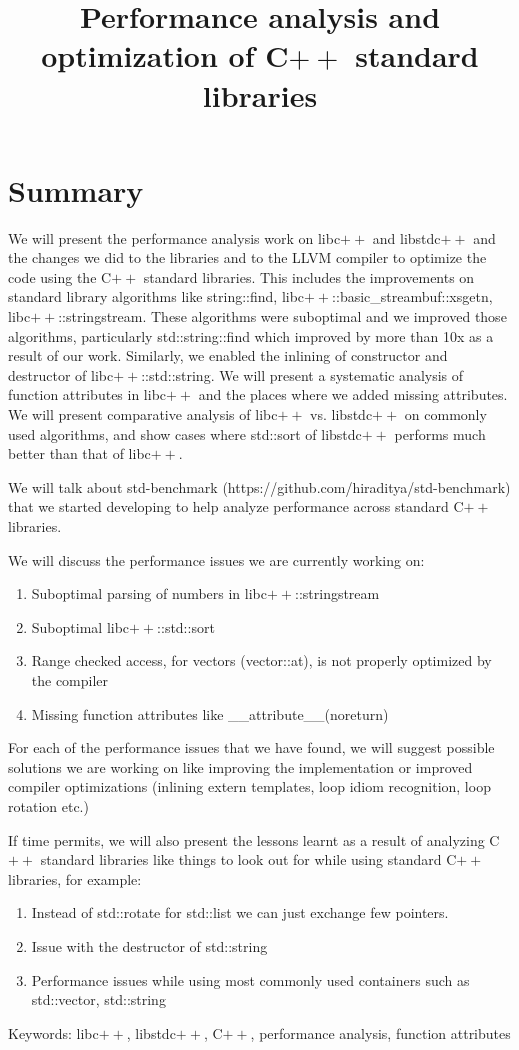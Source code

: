 \documentclass[10pt]{article}
\begin{document}
\title{Performance analysis and optimization of C$++$ standard libraries}
\date{}

\maketitle

\section{Summary}
We will present the performance analysis work on libc$++$ and libstdc$++$ and
the changes we did to the libraries and to the LLVM compiler to optimize the
code using the C$++$ standard libraries. This includes the improvements on
standard library algorithms like string::find,
libc$++$::basic\_streambuf::xsgetn, libc$++$::stringstream. These algorithms
were suboptimal and we improved those algorithms, particularly std::string::find
which improved by more than 10x as a result of our work. Similarly, we enabled
the inlining of constructor and destructor of libc$++$::std::string. We will
present a systematic analysis of function attributes in libc$++$ and the places
where we added missing attributes. We will present comparative analysis of
libc$++$ vs. libstdc$++$ on commonly used algorithms, and show cases where
std::sort of libstdc$++$ performs much better than that of libc$++$.

We will talk about std-benchmark (https://github.com/hiraditya/std-benchmark)
that we started developing to help analyze performance across standard C$++$
libraries.

We will discuss the performance issues we are currently working on:
\begin{enumerate}
\item Suboptimal parsing of numbers in libc$++$::stringstream
\item Suboptimal libc$++$::std::sort
\item Range checked access, for vectors (vector::at), is not properly optimized
  by the compiler
\item Missing function attributes like \_\_attribute\_\_(noreturn)
\end{enumerate}

For each of the performance issues that we have found, we will suggest possible
solutions we are working on like improving the implementation or improved
compiler optimizations (inlining extern templates, loop idiom recognition, loop
rotation etc.)

If time permits, we will also present the lessons learnt as a result of
analyzing C$++$ standard libraries like things to look out for while using
standard C$++$ libraries, for example:\
\begin{enumerate}
\item Instead of std::rotate for std::list we can just exchange few pointers.
\item Issue with the destructor of std::string
\item Performance issues while using most commonly used containers such as
  std::vector, std::string
\end{enumerate}

Keywords: libc$++$, libstdc$++$, C$++$, performance analysis, function attributes
\end{document}
